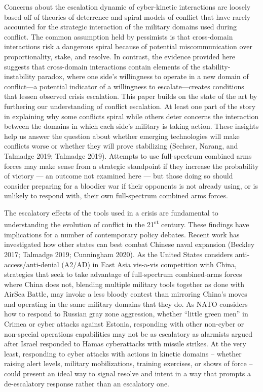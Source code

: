 \documentclass[
]{article}
\begin{document}
Concerns about the escalation dynamic of cyber-kinetic interactions are loosely based off of theories of deterrence and spiral models of conflict that have rarely accounted for the strategic interaction of the military domains used during conflict. The common assumption held by pessimists is that cross-domain interactions risk a dangerous spiral because of potential miscommunication over proportionality, stake, and resolve. In contrast, the evidence provided here suggests that cross-domain interactions contain elements of the stability-instability paradox, where one side's willingness to operate in a new domain of conflict---a potential indicator of a willingness to escalate---creates conditions that lessen observed crisis escalation. This paper builds on the state of the art by furthering our understanding of conflict escalation. At least one part of the story in explaining why some conflicts spiral while others deter concerns the interaction between the domains in which each side's military is taking action. These insights help us answer the question about whether emerging technologies will make conflicts worse or whether they will prove stabilizing (Sechser, Narang, and Talmadge 2019; Talmadge 2019). Attempts to use full-spectrum combined arms forces may make sense from a strategic standpoint if they increase the probability of victory --- an outcome not examined here --- but those doing so should consider preparing for a bloodier war if their opponents is not already using, or is unlikely to respond with, their own full-spectrum combined arms forces.

The escalatory effects of the tools used in a crisis are fundamental to understanding the evolution of conflict in the 21\textsuperscript{st} century. These findings have implications for a number of contemporary policy debates. Recent work has investigated how other states can best combat Chinese naval expansion (Beckley 2017; Talmadge 2019; Cunningham 2020). As the United States considers anti-access/anti-denial (A2/AD) in East Asia vis-a-vis competition with China, strategies that seek to take advantage of full-spectrum combined-arms forces where China does not, blending multiple military tools together as done with AirSea Battle, may invoke a less bloody contest than mirroring China's moves and operating in the same military domains that they do. As NATO considers how to respond to Russian gray zone aggression, whether ``little green men'' in Crimea or cyber attacks against Estonia, responding with other non-cyber or non-special operations capabilities may not be as escalatory as alarmists argued after Israel responded to Hamas cyberattacks with missile strikes. At the very least, responding to cyber attacks with actions in kinetic domains -- whether raising alert levels, military mobilizations, training exercises, or shows of force -- could present an ideal way to signal resolve and intent in a way that prompts a de-escalatory response rather than an escalatory one.
\end{document}
